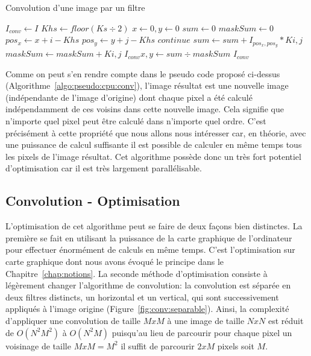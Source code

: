 \begin{algorithm}[H]
	\caption{Convolution d'une image par un filtre}
	\begin{algorithmic}
		\State $I_{conv} \gets I$
		\State $Khs \gets floor(Ks \div 2)$
		\State $x \gets 0, y \gets 0$
		\State $sum \gets 0$
			\State $maskSum \gets 0$
					\State ${pos_x \gets x + i - Khs}$ 
					\State ${pos_y \gets y + j - Khs}$ 
					 
						\State $continue$
					\EndIf
					\State $sum \gets sum + I_{pos_x, pos_y} * K{i, j}$ 
					\State $maskSum \gets maskSum + K{i, j}$
					\EndFor
				\EndFor
				\State $I_{conv}{x, y} \gets sum \div maskSum$ 
			\EndFor
		\EndFor
		\State \Return $I_{conv}$ 
		\EndProcedure
	\end{algorithmic}
	\label{algo:pseudo:cpu:conv}
\end{algorithm}

Comme on peut s'en rendre compte dans le pseudo code proposé ci-dessus (Algorithme~\ref{algo:pseudo:cpu:conv}), l'image résultat est une nouvelle image (indépendante de l'image d'origine) dont chaque pixel a été calculé indépendamment de ces voisins dans cette nouvelle image. Cela signifie que n'importe quel pixel peut être calculé dans n'importe quel ordre. C'est précisément à cette propriété que nous allons nous intéresser car, en théorie, avec une puissance de calcul suffisante il est possible de calculer en même temps tous les pixels de l'image résultat. Cet algorithme possède donc un très fort potentiel d'optimisation car il est très largement parallélisable.

\subsection{Convolution - Optimisation}
L'optimisation de cet algorithme peut se faire de deux façons bien distinctes. La première se fait en utilisant la puissance de la carte graphique de l'ordinateur pour effectuer énormément de calculs en même temps. C'est l'optimisation sur carte graphique dont nous avons évoqué le principe dans le Chapitre~\ref{chap:notions}. La seconde méthode d'optimisation consiste à légèrement changer l'algorithme de convolution: la convolution est séparée en deux filtres distincts\cite{podlozhnyuk2007image}, un horizontal et un vertical, qui sont successivement appliqués à l'image origine (Figure~\ref{fig:conv:separable}). Ainsi, la complexité d'appliquer une convolution de taille $MxM$ à une image de taille $NxN$ est réduit de $O(N^2M^2)$ à $O(N^2M)$ puisqu'au lieu de parcourir pour chaque pixel un voisinage de taille $MxM = M ^2$ il suffit de parcourir $2xM$ pixels soit $M$.

